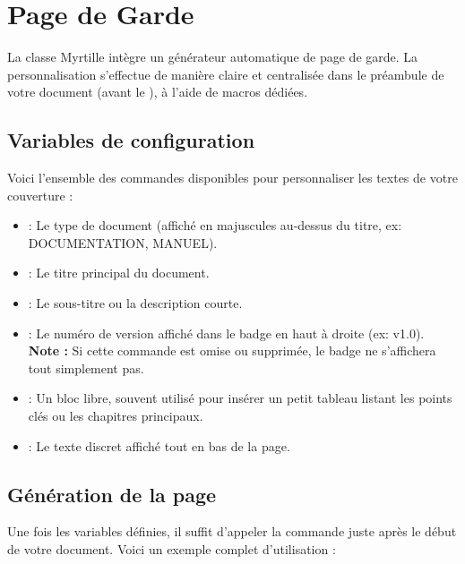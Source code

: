 \section{Page de Garde}

La classe Myrtille intègre un générateur automatique de page de garde. La personnalisation s'effectue de manière claire et centralisée dans le préambule de votre document (avant le ), à l'aide de macros dédiées.

\subsection{Variables de configuration}

Voici l'ensemble des commandes disponibles pour personnaliser les textes de votre couverture :

\begin{itemize}
    \item {} : Le type de document (affiché en majuscules au-dessus du titre, ex: DOCUMENTATION, MANUEL).
    \item {} : Le titre principal du document.
    \item {} : Le sous-titre ou la description courte.
    \item {} : Le numéro de version affiché dans le badge en haut à droite (ex: v1.0). \textbf{Note :} Si cette commande est omise ou supprimée, le badge ne s'affichera tout simplement pas.
    \item {} : Un bloc libre, souvent utilisé pour insérer un petit tableau listant les points clés ou les chapitres principaux.
    \item {} : Le texte discret affiché tout en bas de la page.
\end{itemize}

\subsection{Génération de la page}

Une fois les variables définies, il suffit d'appeler la commande  juste après le début de votre document. Voici un exemple complet d'utilisation :

